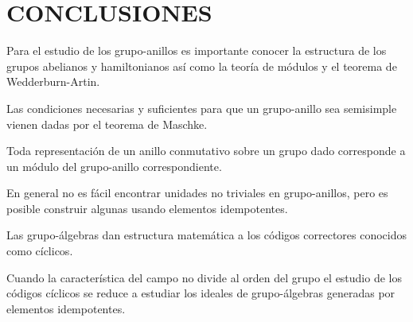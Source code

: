 \chapter{CONCLUSIONES}


\begin{bulletList}
\item Para el estudio de los grupo-anillos es importante conocer la estructura de los grupos abelianos y hamiltonianos así como la teoría de módulos y el teorema de Wedderburn-Artin.
\item Las condiciones necesarias y suficientes para que un grupo-anillo sea semisimple vienen dadas por el teorema de Maschke.
\item Toda representación de un anillo conmutativo sobre un grupo dado corresponde a un módulo del grupo-anillo correspondiente.
\item En general no es fácil encontrar unidades no triviales en grupo-anillos, pero es posible construir algunas usando elementos idempotentes.
\item Las grupo-álgebras dan estructura matemática a los códigos correctores conocidos como cíclicos. 
\item Cuando la característica del campo no divide al orden del grupo el estudio de los códigos cíclicos se reduce a estudiar los ideales de grupo-álgebras generadas por elementos idempotentes.
\end{bulletList}
